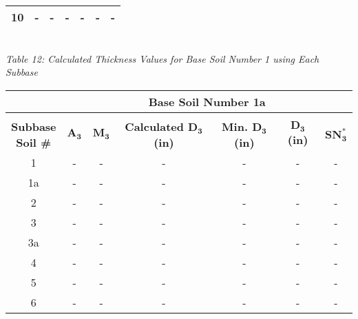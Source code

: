 \documentclass{article}
\begin{document}
\begin{center}
\begin{spacing}{1.6}
\begin{tabular}{|c|cccccc|}
                                            10      & -     & -    & -    & -                    & -              & -               \\\hline
        \end{tabular}
        \vspace{3mm}
        \emph{\\Table 12: Calculated Thickness Values for Base Soil Number 1 using Each Subbase}
        \newpage
        \begin{tabular}{|c|cccccc|}
            \hline    
            \multicolumn{1}{|l}{}                     & \multicolumn{6}{c|}{\textbf{Base Soil Number 1a}}                                              \\\hline
            &&&&&&\\
             \shortstack[c]{\textbf{Subbase}\\\textbf{Soil \#}} & $\bm{A_3}$ & $\bm{M_3}$  & \textbf{Calculated $\bm{D_3}$ (in)} & \textbf{Min. $\bm{D_3}$ (in)} & \textbf{$\bm{D_3}$ (in)} & $\bm{SN_3^*}$  \\\hline
                                            1       & -     & -    & -    & -                    & -              & -               \\
                                            1a      & -     & -    & -    & -                    & -              & -               \\
                                            2       & -     & -    & -    & -                    & -              & -               \\
                                            3       & -     & -    & -    & -                    & -              & -               \\
                                            3a      & -     & -    & -    & -                    & -              & -               \\
                                            4       & -     & -    & -    & -                    & -              & -               \\
                                            5       & -     & -    & -    & -                    & -              & -               \\
                                            6       & -     & -    & -    & -                    & -              & -               \\

\end{tabular}
\end{spacing}
\end{center}
\end{document}
